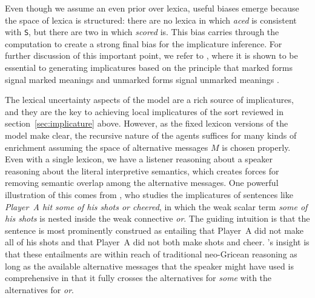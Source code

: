 \documentclass[leqno,12pt]{article}
\newcommand{\secref}[1]{section~\ref{#1}}
\newcommand{\word}[1]{\emph{#1}}
\newcommand{\Messages}{M}
\newcommand{\world}[1]{\texttt{#1}}
\begin{document}
{Even though we assume an even prior over lexica, useful biases emerge
because the space of lexica is structured: there are no lexica in
which \word{aced} is consistent with \world{S}, but there are two in
which \word{scored} is. This bias carries through the computation to
create a strong final bias for the implicature inference. For further
discussion of this important point, we refer to
\citealt{Bergen:Levy:Goodman:2014}, where it is shown to be essential
to generating implicatures based on the principle that marked forms
signal marked meanings and unmarked forms signal unmarked meanings
\citep{McCawley78,Horn84,Blutner98,Levinson00}.

The lexical uncertainty aspects of the model are a rich source of
implicatures, and they are the key to achieving local implicatures of
the sort reviewed in \secref{sec:implicature} above. However, as the
fixed lexicon versions of the model make clear, the recursive nature
of the agents suffices for many kinds of enrichment assuming the space
of alternative messages $\Messages$ is chosen properly. Even with a
single lexicon, we have a listener reasoning about a speaker reasoning
about the literal interpretive semantics, which creates forces for
removing semantic overlap among the alternative messages. One powerful
illustration of this comes from \citet{Sauerland01,Sauerland04}, who
studies the implicatures of sentences like \word{Player~A hit some of
  his shots or cheered}, in which the weak scalar term \word{some of
  his shots} is nested inside the weak connective \word{or}. The
guiding intuition is that the sentence is most prominently construed
as entailing that Player~A did not make all of his shots and that
Player~A did not both make shots and cheer. \citeauthor{Sauerland01}'s
insight is that these entailments are within reach of traditional
neo-Gricean reasoning as long as the available alternative messages
that the speaker might have used is comprehensive in that it fully
crosses the alternatives for \word{some} with the alternatives for
\word{or}.

}
\end{document}
